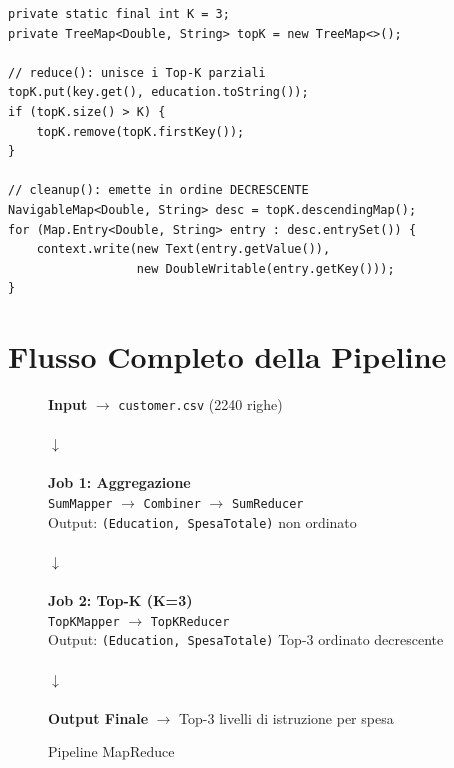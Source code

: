 \documentclass[a4paper, 12pt, oneside]{report}
\begin{document}
\begin{lstlisting}[caption=Logica del TopKReducer]
private static final int K = 3;
private TreeMap<Double, String> topK = new TreeMap<>();

// reduce(): unisce i Top-K parziali
topK.put(key.get(), education.toString());
if (topK.size() > K) {
    topK.remove(topK.firstKey());
}

// cleanup(): emette in ordine DECRESCENTE
NavigableMap<Double, String> desc = topK.descendingMap();
for (Map.Entry<Double, String> entry : desc.entrySet()) {
    context.write(new Text(entry.getValue()),
                  new DoubleWritable(entry.getKey()));
}
\end{lstlisting}

\section{Flusso Completo della Pipeline}

\begin{figure}[H]
    \centering
    \begin{tcolorbox}[colback=green!5,colframe=green!40!black,width=\textwidth]
    \textbf{Input} $\rightarrow$ \texttt{customer.csv} (2240 righe)\\
    \\
    $\downarrow$\\
    \\
    \textbf{Job 1: Aggregazione}\\
    \texttt{SumMapper} $\rightarrow$ \texttt{Combiner} $\rightarrow$ \texttt{SumReducer}\\
    Output: \texttt{(Education, SpesaTotale)} non ordinato\\
    \\
    $\downarrow$\\
    \\
    \textbf{Job 2: Top-K (K=3)}\\
    \texttt{TopKMapper} $\rightarrow$ \texttt{TopKReducer}\\
    Output: \texttt{(Education, SpesaTotale)} Top-3 ordinato decrescente\\
    \\
    $\downarrow$\\
    \\
    \textbf{Output Finale} $\rightarrow$ Top-3 livelli di istruzione per spesa
    \end{tcolorbox}
    \caption{Pipeline MapReduce}
\end{figure}
\end{document}
